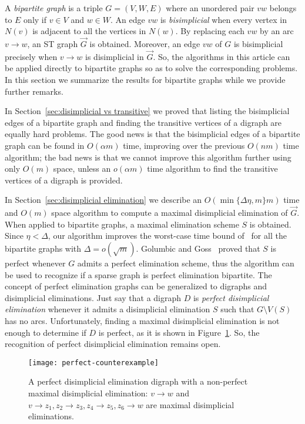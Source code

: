 \documentclass[a4paper,11pt]{article}
\begin{document}
A \emph{bipartite graph} is a triple $G = (V, W, E)$ where an unordered pair $vw$ belongs to $E$ only if $v \in V$ and $w \in W$.  An edge $vw$ is \emph{bisimplicial} when every vertex in $N(v)$ is adjacent to all the vertices in $N(w)$.  By replacing each $vw$ by an arc $v \to w$, an ST graph $\vec{G}$ is obtained.  Moreover, an edge $vw$ of $G$ is bisimplicial precisely when $v \to w$ is disimplicial in $\vec{G}$.  So, the algorithms in this article can be applied directly to bipartite graphs so as to solve the corresponding problems.  In this section we summarize the results for bipartite graphs while we provide further remarks.

In Section~\ref{sec:disimplicial vs transitive} we proved that listing the bisimplicial edges of a bipartite graph and finding the transitive vertices of a digraph are equally hard problems.  The good news is that the bisimplicial edges of a bipartite graph can be found in $O(\alpha m)$ time, improving over the previous $O(nm)$ time algorithm; the bad news is that we cannot improve this algorithm further using only $O(m)$ space, unless an $o(\alpha m)$ time algorithm to find the transitive vertices of a digraph is provided.  

In Section~\ref{sec:disimplicial elimination} we describe an $O(\min\{\Delta \eta, m\}m)$ time and $O(m)$ space algorithm to compute a maximal disimplicial elimination of $\vec{G}$.  When applied to bipartite graphs, a maximal elimination scheme $S$ is obtained.  Since $\eta < \Delta$, our algorithm improves the worst-case time bound of~\cite{Bomhoff2011} for all the bipartite graphs with $\Delta = o(\sqrt{m})$.  Golumbic and Goss~\cite{GolumbicGossJGT1978} proved that $S$ is perfect whenever $G$ admits a perfect elimination scheme, thus the algorithm can be used to recognize if a sparse graph is perfect elimination bipartite.  The concept of perfect elimination graphs can be generalized to digraphs and disimplicial eliminations.  Just say that a digraph $D$ is \emph{perfect disimplicial elimination} whenever it admits a disimplicial elimination $S$ such that $G \setminus V(S)$ has no arcs.  Unfortunately, finding a maximal disimplicial elimination is not enough to determine if $D$ is perfect, as it is shown in Figure~\ref{fig:maximal not perfect}.  So, the recognition of perfect disimplicial elimination remains open.

\begin{figure}
  \centering
  \texttt{[image: perfect-counterexample]}
  \caption{A perfect disimplicial elimination digraph with a non-perfect maximal disimplicial elimination: $v \to w$ and $v \to z_1, z_2 \to z_3, z_4 \to z_5, z_6 \to w$ are maximal disimplicial eliminations.}\label{fig:maximal not perfect}
\end{figure}
\end{document}
